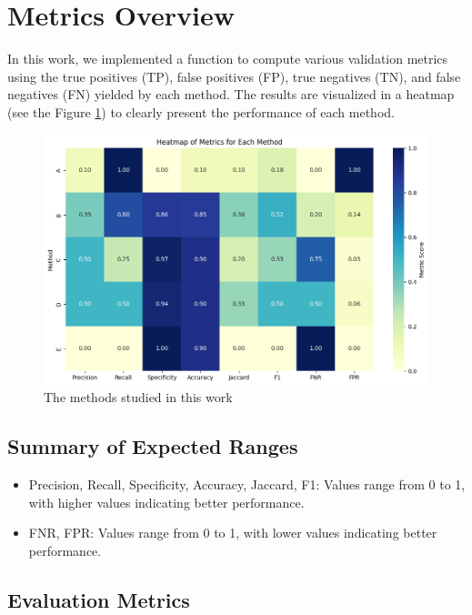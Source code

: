 \documentclass{llncs}
\begin{document}
\section{Metrics Overview}

In this work, we implemented a function to compute various validation metrics using the true positives (TP), false positives (FP), true negatives (TN), and false negatives (FN) yielded by each method. The results are visualized in a heatmap  (see the Figure \ref{fig:heatmap}) to clearly present the performance of each method.

\begin{figure}[h!]
	\begin{center}  %
		\includegraphics[width=1\textwidth]{images/heat_map.png}
		\caption{The methods studied in this work}
		\label{fig:heatmap}
	\end{center}
\end{figure}


\subsection{Summary of Expected Ranges}
\begin{itemize}
	\item Precision, Recall, Specificity, Accuracy, Jaccard, F1: Values range from 0 to 1, with higher values indicating better performance.
	\item FNR, FPR: Values range from 0 to 1, with lower values indicating better performance.
\end{itemize}


\subsection{Evaluation Metrics}
\end{document}
